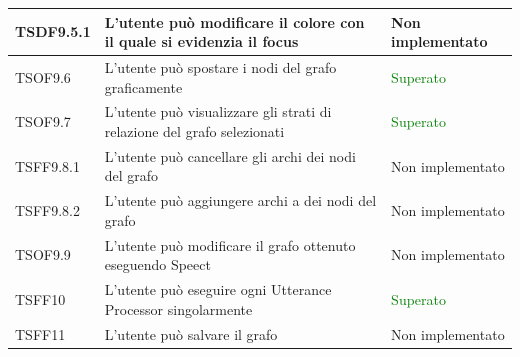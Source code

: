 \documentclass[openany,12pt,a4paper]{report}
\begin{document}
\begin{longtable}{| p{2cm} |p{8cm} | p{2.5cm} |}
	\newline TSDF9.5.1&
	\newline L'utente può modificare il colore con il quale si evidenzia il focus&
	\newline Non implementato
	\\[1em]
	\hline
	
	\newline TSOF9.6&
	\newline L'utente può spostare i nodi del grafo graficamente&
	\newline \textcolor{green}{Superato}
	\\[1em]
	\hline
	
	\newline TSOF9.7&
	\newline L'utente può visualizzare gli strati di relazione del grafo selezionati&
	\newline \textcolor{green}{Superato}
	\\[1em]
	\hline
	
	\newline TSFF9.8.1&
	\newline L'utente può cancellare gli archi dei nodi del grafo&
	\newline Non implementato
	\\[1em]
	\hline
	
	\newline TSFF9.8.2&
	\newline L'utente può aggiungere archi a dei nodi del grafo&
	\newline Non implementato
	\\[1em]
	\hline
	
	\newline TSOF9.9&
	\newline L'utente può modificare il grafo ottenuto eseguendo Speect&
	\newline Non implementato
	\\[1em]
	\hline	
	
	\newline TSFF10&
	\newline L'utente può eseguire ogni Utterance Processor singolarmente&
	\newline \textcolor{green}{Superato}
	\\[1em]
	\hline
	
	
	\newline TSFF11&
	\newline L'utente può salvare il grafo&
	\newline Non implementato
	\\[1em]
	\hline
	

\end{longtable}
\end{document}
